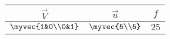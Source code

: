 \begin{tabular}{|c|c|c|}
\hline
         $\vec{V}$ & $\vec{u}$ & $f$ \\
         \hline
         $\myvec{1&0\\0&1} $ & $\myvec{5\\5}$ & $25$ \\  
         \hline
\end{tabular}
    
